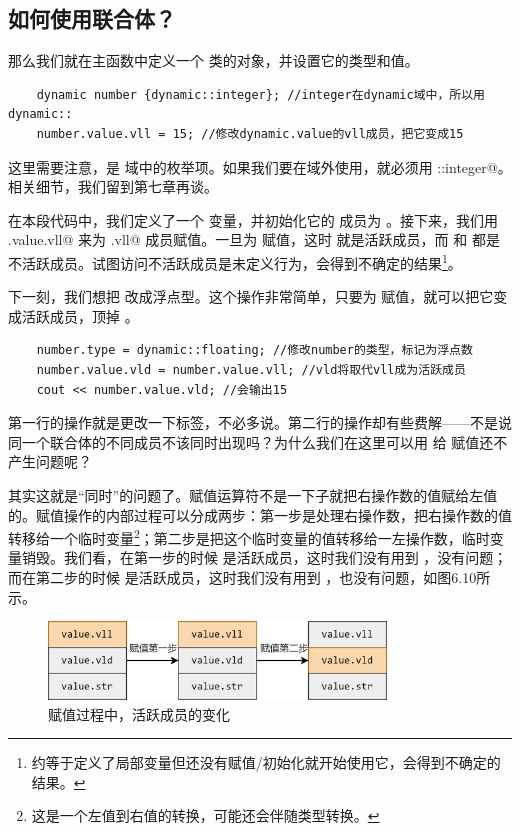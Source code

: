 \subsection*{如何使用联合体？}
那么我们就在主函数中定义一个 \lstinline@dynamic@ 类的对象，并设置它的类型和值。
\begin{lstlisting}
    dynamic number {dynamic::integer}; //integer在dynamic域中，所以用dynamic::
    number.value.vll = 15; //修改dynamic.value的vll成员，把它变成15
\end{lstlisting}
这里需要注意，\lstinline@integer@ 是 \lstinline@dynamic@ 域中的枚举项。如果我们要在域外使用，就必须用 \lstinline@dynamic::integer@。相关细节，我们留到第七章再谈。\par
在本段代码中，我们定义了一个 \lstinline@number@ 变量，并初始化它的 \lstinline@type@ 成员为 \lstinline@integer@。接下来，我们用 \lstinline@number.value.vll@ 来为 \lstinline@value.vll@ 成员赋值。一旦为 \lstinline@vll@ 赋值，这时 \lstinline@vll@ 就是活跃成员，而 \lstinline@vld@ 和 \lstinline@str@ 都是不活跃成员。试图访问不活跃成员是未定义行为，会得到不确定的结果\footnote{约等于定义了局部变量但还没有赋值/初始化就开始使用它，会得到不确定的结果。}。\par
下一刻，我们想把 \lstinline@number@ 改成浮点型。这个操作非常简单，只要为 \lstinline@vld@ 赋值，就可以把它变成活跃成员，顶掉 \lstinline@vll@。\par
\begin{lstlisting}
    number.type = dynamic::floating; //修改number的类型，标记为浮点数
    number.value.vld = number.value.vll; //vld将取代vll成为活跃成员
    cout << number.value.vld; //会输出15
\end{lstlisting}
第一行的操作就是更改一下标签，不必多说。第二行的操作却有些费解——不是说同一个联合体的不同成员不该同时出现吗？为什么我们在这里可以用 \lstinline@vll@ 给 \lstinline@vld@ 赋值还不产生问题呢？\par
其实这就是``同时''的问题了。赋值运算符不是一下子就把右操作数的值赋给左值的。赋值操作的内部过程可以分成两步：第一步是处理右操作数，把右操作数的值转移给一个临时变量\footnote{这是一个左值到右值的转换，可能还会伴随类型转换。}；第二步是把这个临时变量的值转移给一左操作数，临时变量销毁。我们看，在第一步的时候 \lstinline@vll@ 是活跃成员，这时我们没有用到 \lstinline@vld@，没有问题；而在第二步的时候 \lstinline@vld@ 是活跃成员，这时我们没有用到 \lstinline@vll@，也没有问题，如图6.10所示。\par
\begin{figure}[htbp]
    \centering
    \includegraphics[width=0.8\textwidth]{../images/generalized_parts/06_process_of_assignment_to_union.drawio.png}
    \caption{赋值过程中，活跃成员的变化}
\end{figure}
